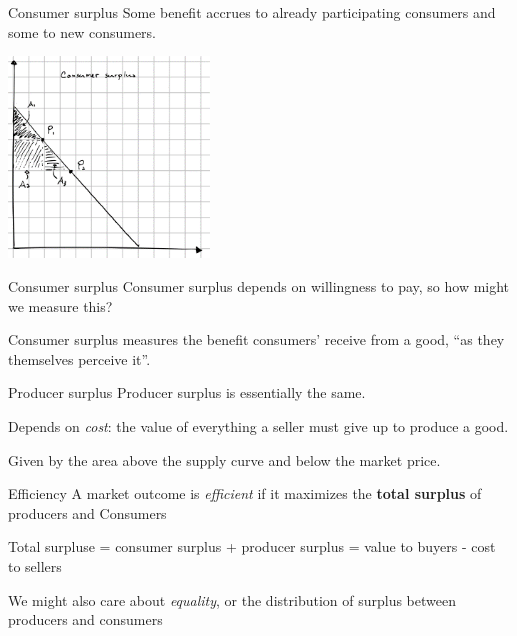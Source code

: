 \documentclass[aspectratio=169]{beamer}
\begin{document}
\begin{frame}{Consumer surplus}
    Some benefit accrues to already participating consumers and some to new consumers.

    \centering
    \includegraphics[width = 0.4\textwidth,keepaspectratio]{surplus2.png}
\end{frame}

\begin{frame}{Consumer surplus}
    Consumer surplus depends on willingness to pay, so how might we measure this?

    \vspace{5mm}

    Consumer surplus measures the benefit consumers' receive from a good, ``as they themselves perceive it''.
\end{frame}

\begin{frame}{Producer surplus}
    Producer surplus is essentially the same.
    
    \vspace{5mm}

    Depends on \textit{cost}: the value of everything a seller must give up to produce a good.

    \vspace{5mm}

    Given by the area above the supply curve and below the market price.
\end{frame}

\begin{frame}{Efficiency}
    A market outcome is \textit{efficient} if it maximizes the \textbf{total surplus} of producers and Consumers

    \vspace{2mm}

    Total surpluse = consumer surplus + producer surplus = value to buyers - cost to sellers

    \vspace{2mm}

    We might also care about \textit{equality}, or the distribution of surplus between producers and consumers

\end{frame}
\end{document}

